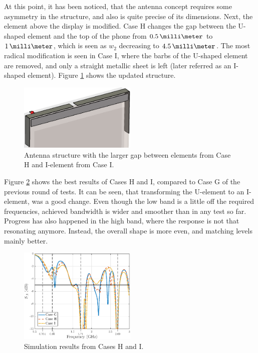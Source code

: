 At this point, it has been noticed, that the antenna concept requires some asymmetry in the structure, and also is quite precise of its dimensions. Next, the element above the display is modified. Case H changes the gap between the U-shaped element and the top of the phone from $0.5\,\milli\meter$ to $1\,\milli\meter$, which is seen as $w_2$ decreasing to $4.5\,\milli\meter$. The most radical modification is seen in Case I, where the barbs of the U-shaped element are removed, and only a straight metallic sheet is left (later referred as an I-shaped element). Figure \ref{fig:concept_i_shape} shows the updated structure.
\begin{figure}[H]
    \centering
    \includegraphics[width=0.5\textwidth]{img/concept_i_shape.eps}
    \caption{Antenna structure with the larger gap between elements from Case H and I-element from Case I.}
    \label{fig:concept_i_shape}
\end{figure}

Figure \ref{fig:concept4} shows the best results of Cases H and I, compared to Case G of the previous round of tests. It can be seen, that transforming the U-element to an I-element, was a good change. Even though the low band is a little off the required frequencies, achieved bandwidth is wider and smoother than in any test so far. Progress has also happened in the high band, where the response is not that resonating anymore. Instead, the overall shape is more even, and matching levels mainly better.
\begin{figure}[H]
    \centering
    \includegraphics[width=0.5\textwidth]{img/concept4.eps}
    \caption{Simulation results from Cases H and I.}
    \label{fig:concept4}
\end{figure}

